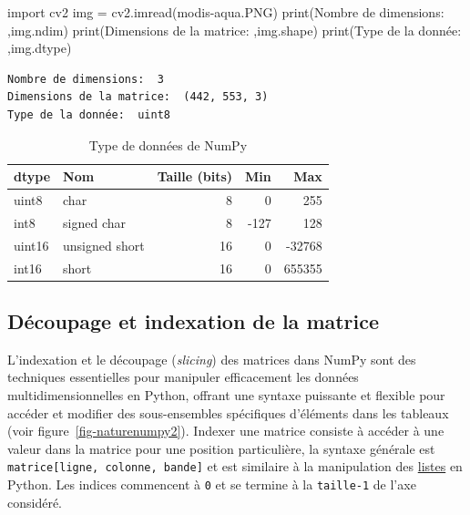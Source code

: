 \documentclass[
  11pt,
  letterpaper,
  open=any,
  twoside=false,
  french]{scrbook}
\newenvironment{Shaded}{\begin{snugshade}}{\end{snugshade}}
\newcommand{\BuiltInTok}[1]{\textcolor[rgb]{0.00,0.23,0.31}{#1}}
\newcommand{\ImportTok}[1]{\textcolor[rgb]{0.00,0.46,0.62}{#1}}
\newcommand{\NormalTok}[1]{\textcolor[rgb]{0.00,0.23,0.31}{#1}}
\newcommand{\OperatorTok}[1]{\textcolor[rgb]{0.37,0.37,0.37}{#1}}
\newcommand{\StringTok}[1]{\textcolor[rgb]{0.13,0.47,0.30}{#1}}
\begin{document}
\begin{Shaded}
\begin{Highlighting}[]
\ImportTok{import}\NormalTok{ cv2}
\NormalTok{img }\OperatorTok{=}\NormalTok{ cv2.imread(}\StringTok{\textquotesingle{}modis{-}aqua.PNG\textquotesingle{}}\NormalTok{)}
\BuiltInTok{print}\NormalTok{(}\StringTok{\textquotesingle{}Nombre de dimensions: \textquotesingle{}}\NormalTok{,img.ndim)}
\BuiltInTok{print}\NormalTok{(}\StringTok{\textquotesingle{}Dimensions de la matrice: \textquotesingle{}}\NormalTok{,img.shape)}
\BuiltInTok{print}\NormalTok{(}\StringTok{\textquotesingle{}Type de la donnée: \textquotesingle{}}\NormalTok{,img.dtype)}
\end{Highlighting}
\end{Shaded}

\begin{verbatim}
Nombre de dimensions:  3
Dimensions de la matrice:  (442, 553, 3)
Type de la donnée:  uint8
\end{verbatim}

\begin{longtable}[]{@{}llrrr@{}}

\caption{\label{tbl-numpytype}Type de données de NumPy}

\tabularnewline

\toprule\noalign{}
dtype & Nom & Taille (bits) & Min & Max \\
\midrule\noalign{}
\endhead
\bottomrule\noalign{}
\endlastfoot
uint8 & char & 8 & 0 & 255 \\
int8 & signed char & 8 & -127 & 128 \\
uint16 & unsigned short & 16 & 0 & -32768 \\
int16 & short & 16 & 0 & 655355 \\

\end{longtable}

\subsection{Découpage et indexation de la
matrice}\label{duxe9coupage-et-indexation-de-la-matrice}

L'indexation et le découpage (\emph{slicing}) des matrices dans NumPy
sont des techniques essentielles pour manipuler efficacement les données
multidimensionnelles en Python, offrant une syntaxe puissante et
flexible pour accéder et modifier des sous-ensembles spécifiques
d'éléments dans les tableaux (voir figure~\ref{fig-naturenumpy2}).
Indexer une matrice consiste à accéder à une valeur dans la matrice pour
une position particulière, la syntaxe générale est
\texttt{matrice{[}ligne,\ colonne,\ bande{]}} et est similaire à la
manipulation des
\href{https://docs.python.org/fr/3/tutorial/introduction.html\#lists}{listes}
en Python. Les indices commencent à \texttt{0} et se termine à la
\texttt{taille-1} de l'axe considéré.
\end{document}
